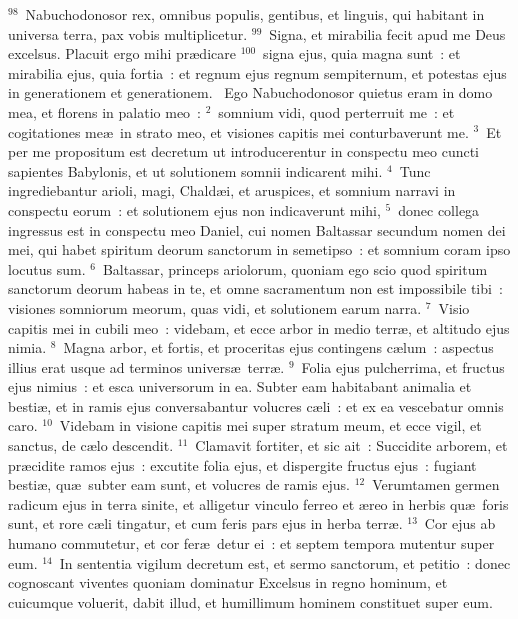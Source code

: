 ${}^{98}$~Nabuchodonosor rex, omnibus populis, gentibus, et linguis, qui habitant in universa terra, pax vobis multiplicetur.
${}^{99}$~Signa, et mirabilia fecit apud me Deus excelsus. Placuit ergo mihi pr\ae dicare
${}^{100}$~signa ejus, quia magna sunt~: et mirabilia ejus, quia fortia~: et regnum ejus regnum sempiternum, et potestas ejus in generationem et generationem.
~Ego Nabuchodonosor quietus eram in domo mea, et florens in palatio meo~:
${}^{2}$~somnium vidi, quod perterruit me~: et cogitationes me\ae\ in strato meo, et visiones capitis mei conturbaverunt me.
${}^{3}$~Et per me propositum est decretum ut introducerentur in conspectu meo cuncti sapientes Babylonis, et ut solutionem somnii indicarent mihi.
${}^{4}$~Tunc ingrediebantur arioli, magi, Chald\ae i, et aruspices, et somnium narravi in conspectu eorum~: et solutionem ejus non indicaverunt mihi,
${}^{5}$~donec collega ingressus est in conspectu meo Daniel, cui nomen Baltassar secundum nomen dei mei, qui habet spiritum deorum sanctorum in semetipso~: et somnium coram ipso locutus sum.
${}^{6}$~Baltassar, princeps ariolorum, quoniam ego scio quod spiritum sanctorum deorum habeas in te, et omne sacramentum non est impossibile tibi~: visiones somniorum meorum, quas vidi, et solutionem earum narra.
${}^{7}$~Visio capitis mei in cubili meo~: videbam, et ecce arbor in medio terr\ae , et altitudo ejus nimia.
${}^{8}$~Magna arbor, et fortis, et proceritas ejus contingens c\ae lum~: aspectus illius erat usque ad terminos univers\ae\ terr\ae .
${}^{9}$~Folia ejus pulcherrima, et fructus ejus nimius~: et esca universorum in ea. Subter eam habitabant animalia et besti\ae , et in ramis ejus conversabantur volucres c\ae li~: et ex ea vescebatur omnis caro.
${}^{10}$~Videbam in visione capitis mei super stratum meum, et ecce vigil, et sanctus, de c\ae lo descendit.
${}^{11}$~Clamavit fortiter, et sic ait~: Succidite arborem, et pr\ae cidite ramos ejus~: excutite folia ejus, et dispergite fructus ejus~: fugiant besti\ae , qu\ae\ subter eam sunt, et volucres de ramis ejus.
${}^{12}$~Verumtamen germen radicum ejus in terra sinite, et alligetur vinculo ferreo et \ae reo in herbis qu\ae\ foris sunt, et rore c\ae li tingatur, et cum feris pars ejus in herba terr\ae .
${}^{13}$~Cor ejus ab humano commutetur, et cor fer\ae\ detur ei~: et septem tempora mutentur super eum.
${}^{14}$~In sententia vigilum decretum est, et sermo sanctorum, et petitio~: donec cognoscant viventes quoniam dominatur Excelsus in regno hominum, et cuicumque voluerit, dabit illud, et humillimum hominem constituet super eum.
